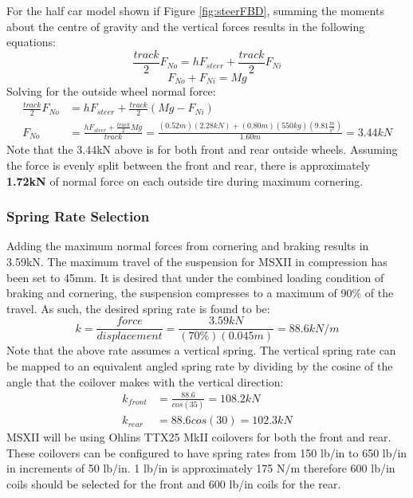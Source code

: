 \documentclass[12pt]{article}
\begin{document}
\noindent For the half car model shown if Figure \ref{fig:steerFBD}, summing the moments about the centre of gravity and the vertical forces results in the following equations: 
\begin{equation}
	\frac{track}{2}F_{No} = hF_{steer} + \frac{track}{2}F_{Ni}
\end{equation}
\begin{equation}
	F_{No} + F_{Ni} = Mg
\end{equation}
Solving for the outside wheel normal force: 
\begin{equation}
\begin{split}
	\frac{track}{2}F_{No} &= hF_{steer} + \frac{track}{2}(Mg - F_{Ni})\\
	F_{No} &= \frac{hF_{steer} + \frac{track}{2}Mg}{track} = \frac{(0.52m)(2.28kN)+(0.80m)(550kg)\left(9.81\frac{m}{s^2}\right)}{1.60m} = 3.44kN
\end{split}
\end{equation}
Note that the 3.44kN above is for both front and rear outside wheels. Assuming the force is evenly split between the front and rear, there is approximately \textbf{1.72kN} of normal force on each outside tire during maximum cornering. 
\subsubsection{Spring Rate Selection}
Adding the maximum normal forces from cornering and braking results in 3.59kN. The maximum travel of the suspension for MSXII in compression has been set to 45mm. It is desired that under the combined loading condition of braking and cornering, the suspension compresses to a maximum of 90\% of the travel. As such, the desired spring rate is found to be: 
\begin{equation}
	k = \frac{force}{displacement} = \frac{3.59kN}{(70\%)(0.045m)} = 88.6kN/m
\end{equation}
Note that the above rate assumes a vertical spring. The vertical spring rate can be mapped to an equivalent angled spring rate by dividing by the cosine of the angle that the coilover makes with the vertical direction: 
\begin{equation}
	\begin{split}
		k_{front} &= \frac{88.6}{cos(35)} = 108.2kN \\
		k_{rear} &= {88.6}{cos(30)} = 102.3kN
	\end{split}
\end{equation}
MSXII will be using Ohlins TTX25 MkII coilovers for both the front and rear. These coilovers can be configured to have spring rates from 150 lb/in to 650 lb/in in increments of 50 lb/in. 1 lb/in is approximately 175 N/m therefore 600 lb/in coils should be selected for the front and 600 lb/in coils for the rear. 
\end{document}
